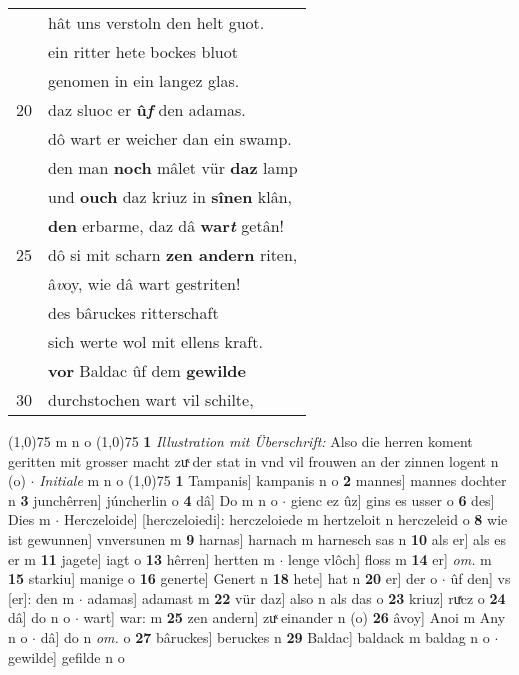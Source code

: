 \documentclass[8pt,a4paper,notitlepage]{article}
\begin{document}
\begin{table}[ht]
\begin{minipage}[t]{0.5\linewidth}
\begin{tabular}{rl}
 & hât uns verstoln den helt guot.\\ 
 & ein ritter hete bockes bluot\\ 
 & genomen in ein langez glas.\\ 
20 & daz sluoc er \textbf{û\textit{f}} den adamas.\\ 
 & dô wart er weicher dan ein swamp.\\ 
 & den man \textbf{noch} mâlet vür \textbf{daz} lamp\\ 
 & und \textbf{ouch} daz kriuz in \textbf{sînen} klân,\\ 
 & \textbf{den} erbarme, daz dâ \textbf{war\textit{t}} getân!\\ 
25 & dô si mit scharn \textbf{zen andern} riten,\\ 
 & â\textit{v}oy, wie dâ wart gestriten!\\ 
 & des bâruckes ritterschaft\\ 
 & sich werte wol mit ellens kraft.\\ 
 & \textbf{vor} Baldac ûf dem \textbf{gewilde}\\ 
30 & durchstochen wart vil schilte,\\ 
\end{tabular}
\scriptsize
\line(1,0){75} \newline
m n o \newline
\line(1,0){75} \newline
\textbf{1} \textit{Illustration mit Überschrift:} Also die herren koment geritten mit grosser macht zuͯ der stat in vnd vil frouwen an der zinnen logent n (o)   $\cdot$ \textit{Initiale} m n o  \newline
\line(1,0){75} \newline
\textbf{1} Tampanis] kampanis n o \textbf{2} mannes] mannes dochter n \textbf{3} junchêrren] júncherlin o \textbf{4} dâ] Do m n o  $\cdot$ gienc ez ûz] gins es usser o \textbf{6} des] Dies m  $\cdot$ Herczeloide] [herczeloiedi]: herczeloiede m hertzeloit n herczeleid o \textbf{8} wie ist gewunnen] vnversunen m \textbf{9} harnas] harnach m harnesch sas n \textbf{10} als er] als es er m \textbf{11} jagete] iagt o \textbf{13} hêrren] hertten m  $\cdot$ lenge vlôch] floss m \textbf{14} er] \textit{om.} m \textbf{15} starkiu] manige o \textbf{16} generte] Genert n \textbf{18} hete] hat n \textbf{20} er] der o  $\cdot$ ûf den] vs [er]: den m  $\cdot$ adamas] adamast m \textbf{22} vür daz] also n als das o \textbf{23} kriuz] ruͯcz o \textbf{24} dâ] do n o  $\cdot$ wart] war: m \textbf{25} zen andern] zuͯ einander n (o) \textbf{26} âvoy] Anoi m Any n o  $\cdot$ dâ] do n \textit{om.} o \textbf{27} bâruckes] beruckes n \textbf{29} Baldac] baldack m baldag n o  $\cdot$ gewilde] gefilde n o \newline
\end{minipage}
\end{table}
\end{document}
